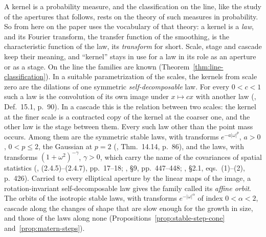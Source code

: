 A kernel is a probability measure, and the classification on the line, like the study of the
apertures that follows, rests on the theory of such measures in probability. So from here on the
paper uses the vocabulary of that theory: a kernel is a \emph{law}, and its Fourier transform, the
transfer function of the smoothing, is the characteristic function of the law, its \emph{transform}
for short. Scale, stage and cascade keep their meaning, and ``kernel'' stays in use for a law in its
role as an aperture or as a stage. On the line the families are known (Theorem~\ref{thm:line-classification}). In
a suitable parametrization of the scales, the kernels from scale zero are the dilations of one symmetric \emph{self-decomposable} law. For every
$0 < c < 1$ such a law is the convolution of its own image under $x \mapsto cx$ with another law
(, Def.~15.1, p.~90). In a cascade this is the relation between two scales: the
kernel at the finer scale is a contracted copy of the kernel at the coarser one, and the other law is
the stage between them. Every such law other than the point mass occurs. Among them are the symmetric
stable laws, with transforms $e^{-a|\omega|^p}$, $a > 0$, $0 < p \le 2$, the Gaussian at $p = 2$
(, Thm.~14.14, p.~86), and the \Matern{} laws, with transforms
$(1 + \omega^2)^{-\gamma}$, $\gamma > 0$, which carry the name of the \Matern{} covariances of spatial
statistics (, (2.4.5)--(2.4.7), pp.~17--18;
, \S9, pp.~447--448; , \S2.1,
eqs.~(1)--(2), p.~426). Carried to every elliptical aperture by the linear maps of the image, a
rotation-invariant self-decomposable law gives the family called its \emph{affine orbit}. The orbits
of the isotropic stable laws, with transforms $e^{-|\omega|^\alpha}$ of index $0 < \alpha < 2$, cascade
along the changes of shape that are slow enough for the growth in size, and those of the \Matern{}
laws along none (Propositions~\ref{prop:stable-step-cone} and~\ref{prop:matern-steps}).

